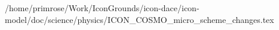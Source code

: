 /home/primrose/Work/IconGrounds/icon-dace/icon-model/doc/science/physics/ICON_COSMO_micro_scheme_changes.tex